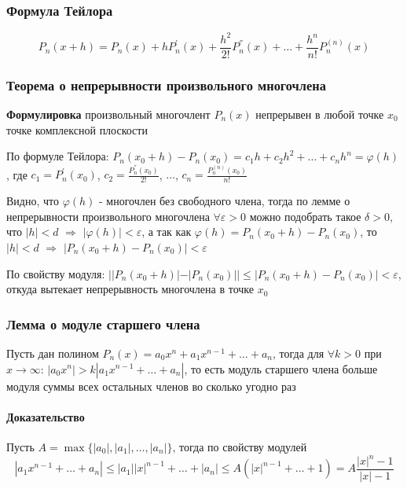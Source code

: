 \documentclass[class=article,a4paper,12pt,crop=false]{standalone}
\begin{document}
\subsubsection{Формула Тейлора}
\begin{equation}
    P_n(x + h) = P_n(x) + hP_n^{'}(x) + \frac{h^2}{2!}P_n^{''}(x) + \dots + \frac{h^n}{n!}P_n^{(n)}(x)
\end{equation}

\subsubsection{Теорема о непрерывности произвольного многочлена}

\textbf{Формулировка} произвольный многочлент $P_n(x)$ непрерывен в любой точке $x_0$ точке комплексной плоскости

По формуле Тейлора: $P_n(x_0 + h) - P_n(x_0) = c_1h + c_2h^2 + \dots + c_nh^n = \varphi(h)$,
где $c_1 = P_n^{'}(x_0)$, $c_2 = \frac{P_n^{''}(x_0)}{2!}$, $\dots$, $c_n = \frac{P_n^{(n)}(x_0)}{n!}$
 
Видно, что $\varphi(h)$ - многочлен без свободного члена, тогда по лемме о непрерывности произвольного
многочлена $\forall \varepsilon > 0$ можно подобрать такое $\delta > 0$, что $|h| < d$ $\Rightarrow$ 
$|\varphi(h)| < \varepsilon$, а так как $\varphi(h) = P_n(x_0 + h) - P_n(x_0)$, то
$|h| < d$ $\Rightarrow$ $|P_n(x_0 + h) - P_n(x_0)| < \varepsilon$

По свойству модуля: $||P_n(x_0 + h)| - |P_n(x_0)|| \leq |P_n(x_0 + h) - P_n(x_0)| < \varepsilon$,
откуда вытекает непрерывность многочлена в точке $x_0$

\subsubsection{Лемма о модуле старшего члена}

Пусть дан полином $P_n(x) = a_0x^n + a_1x^{n - 1} + \dots + a_n$, тогда для $\forall k > 0$
при $x \rightarrow \infty$: $|a_0x^n| > k|a_1x^{n-1} + \dots + a_n|$, то есть модуль старшего
члена больше модуля суммы всех остальных членов во сколько угодно раз

\paragraph{Доказательство} Пусть $A = \max\{|a_0|, |a_1|, \dots, |a_n|\}$, тогда по свойству модулей
\begin{equation}
    |a_1x^{n - 1} + \dots + a_n| \leq |a_1||x|^{n - 1} + \dots + |a_n|
    \leq A(|x|^{n - 1} + \dots + 1) = A\frac{|x|^n - 1}{|x| - 1}
\end{equation}
\end{document}
